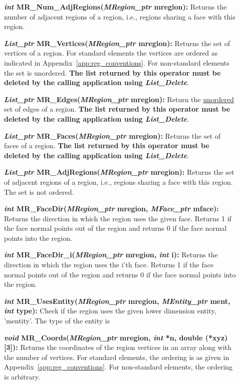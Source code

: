 \documentclass[12pt]{article}
\begin{document}
\begin{description}
\item[]{\bf {\em int} MR\_Num\_AdjRegions({\em MRegion\_ptr}
mregion):} Returns the number of adjacent regions of a region, i.e.,
regions sharing a face with this region.

\item[] 

\item[]{\bf {\em List\_ptr} MR\_Vertices({\em MRegion\_ptr}
mregion):} Returns the set of vertices of a region. For standard
elements the vertices are ordered as indicated in
Appendix~\ref{app:reg_conventions}. For non-standard elements the set
is unordered. {\bf The list returned by this
  operator must be deleted by the calling application using {\em List\_Delete}}.

\item[]{\bf {\em List\_ptr} MR\_Edges({\em MRegion\_ptr} mregion):}
Return the \underline{unordered} set of edges of a region.  {\bf The list returned by this
  operator must be deleted by the calling application using {\em List\_Delete}}.

\item[]{\bf {\em List\_ptr} MR\_Faces({\em MRegion\_ptr} mregion):}
Returns the set of faces of a region. {\bf The list returned by this
  operator must be deleted by the calling application using {\em List\_Delete}}.

\item[]{\bf {\em List\_ptr} MR\_AdjRegions({\em MRegion\_ptr}
mregion):} Returns the set of adjacent regions of a region, i.e.,
regions sharing a face with this region. The set is not ordered.

\item[]{\bf {\em int} MR\_FaceDir({\em MRegion\_ptr} mregion,
{\em MFace\_ptr} mface):} Returns the direction in which the region
uses the given face. Returns 1 if the face normal points out of the
region and returns 0 if the face normal points into the region.

\item[]{\bf {\em int} MR\_FaceDir\_i({\em MRegion\_ptr} mregion,
{\em int} i):} Returns the direction in which the region uses the
i'th face. Returns 1 if the face normal points out of the region and
returns 0 if the face normal points into the region.


\item[]

\item[]{\bf {\em int} MR\_UsesEntity({\em MRegion\_ptr} mregion,
{\em MEntity\_ptr} ment, {\em int} type):} Check if the region
uses the given lower dimension entity, 'mentity'. The type of the
entity is

\item[]

\item[]{\bf {\em void} MR\_Coords({\em MRegion\_ptr} mregion,
{\em int} *n, double (*xyz)[3]):} Returns the coordinates of the
region vertices in an array along with the number of vertices. For
standard elements, the ordering is as given in
Appendix~\ref{app:reg_conventions}. For non-standard elements, the
ordering is arbitrary.
\end{description}
\end{document}
